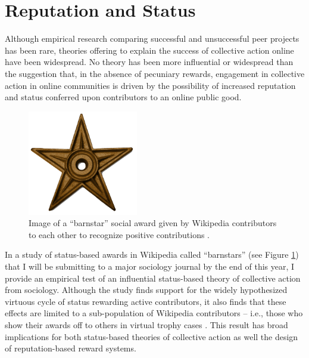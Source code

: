 \documentclass[10pt]{memoir}
\begin{document}
\section{Reputation and Status}

Although empirical research comparing successful and unsuccessful peer
projects has been rare, theories offering to explain the success of
collective action online have been widespread. No theory has been more
influential or widespread than the suggestion that, in the absence of
pecuniary rewards, engagement in collective action in online
communities is driven by the possibility of increased reputation and
status conferred upon contributors to an online public good.

\begin{figure}
 \vspace{-1em}
 \begin{centering}
 \includegraphics[width=1.9in]{figures/barnstar_alone.png}
 \caption{Image of a ``barnstar'' social award given by Wikipedia
   contributors to each other to recognize positive contributions .}
 \label{fig:barnstar}
 \end{centering}
 \vspace{-1em}
\end{figure}

In a study of status-based awards in Wikipedia called ``barnstars''
(see Figure \ref{fig:barnstar}) that I will be submitting to a major
sociology journal by the end of this year, I provide an empirical test
of an influential status-based theory of collective action from
sociology. Although the study finds support for the widely
hypothesized virtuous cycle of status rewarding active contributors,
it also finds that these effects are limited to a sub-population of
Wikipedia contributors -- i.e., those who show their awards off to
others in virtual trophy cases \cite{hill_status_2012}. This result
has broad implications for both status-based theories of collective
action as well the design of reputation-based reward systems.
\end{document}
